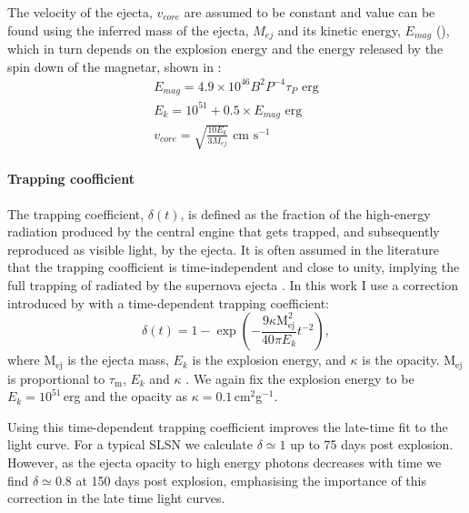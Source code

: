 The velocity of the ejecta, $v_{core}$ are assumed to be constant and value can be found using the inferred mass of the ejecta, $M_{ej}$ and its kinetic energy, $E_{mag}$ (), which in turn depends on the explosion energy and the energy released by the spin down of the magnetar, shown in :
\begin{align}
\label{Eq:Emag}
E_{mag} = 4.9\times10^{46} B^2 P^{-4} \tau_{P}  \text{ erg} \\
E_k = 10^{51} + 0.5 \times E_{mag} \text{ erg}\\
\label{Eq:vcore}
v_{core} =  \sqrt{\frac{10 E_{k}}{3 M_{ej}}} \text{ cm s}^{-1}
\end{align}

\paragraph{Trapping coofficient}
The trapping coefficient, $\delta(t)$, is defined as the fraction of the high-energy radiation produced by the central engine that gets trapped, and subsequently reproduced as visible light, by the ejecta. It is often assumed in the literature that the trapping coofficient is time-independent and close to unity, implying the full trapping of radiated by the supernova ejecta \citep{2013ApJ...770..128I,2015MNRAS.449.1215P,2015MNRAS.452.3869N}. In this work I use a correction introduced by \cite{2015ApJ...799..107W} with a time-dependent trapping coefficient:
\begin{equation}
\delta(t) = 1 - \exp\left({-\frac{9\kappa \mathrm{M}_{\mathrm{ej}}^{2}}{40\pi  E_k} t^{-2}} \right),
\label{Eq:Wang}
\end{equation}
\noindent where $\mathrm{M}_{\mathrm{ej}}$ is the ejecta mass, $E_k$ is the explosion energy, and $\kappa$ is the opacity. $\mathrm{M}_{\mathrm{ej}}$ is proportional to $\tau_\mathrm{m}$, $E_k$ and $\kappa$ \citep{2013ApJ...770..128I}. We again fix the explosion energy to be $E_k = 10^{51}$\,erg and the opacity as $\kappa =0.1$\,cm$^2$g$^{-1}$.

Using this time-dependent trapping coefficient improves the late-time fit to the light curve. For a typical SLSN we calculate $\delta \simeq 1$ up to 75 days post explosion. However, as the ejecta opacity to high energy photons decreases with time we find $\delta \simeq 0.8$ at 150 days post explosion, emphasising the importance of this correction in the late time light curves.

